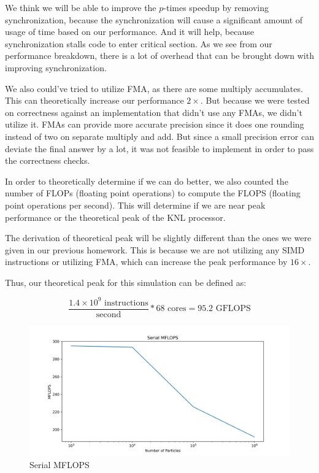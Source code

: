 \documentclass{article}
\begin{document}
We think we will be able to improve the $p$-times speedup by removing synchronization, because the synchronization will cause a significant amount of usage of time based on our performance. And it will help, because synchronization stalls code to enter critical section. As we see from our performance breakdown, there is a lot of overhead that can be brought down with improving synchronization.

We also could've tried to utilize FMA, as there are some multiply accumulates. This can theoretically increase our performance $2\times$. But because we were tested on correctness against an implementation that didn't use any FMAs, we didn't utilize it. FMAs can provide more accurate precision since it does one rounding instead of two on separate multiply and add. But since a small precision error can deviate the final answer by a lot, it was not feasible to implement in order to pass the correctness checks.

In order to theoretically determine if we can do better, we also counted the number of FLOPs (floating point operations) to compute the FLOPS (floating point operations per second). This will determine if we are near peak performance or the theoretical peak of the KNL processor.

The derivation of theoretical peak will be slightly different than the ones we were given in our previous homework. This is because we are not utilizing any SIMD instructions or utilizing FMA, which can increase the peak performance by $16\times$.

Thus, our theoretical peak for this simulation can be defined as:

$$\frac{1.4 \times 10^9 \textrm{ instructions}}{\textrm{second}} * 68 \textrm{ cores} = 95.2 \textrm{ GFLOPS}$$

\begin{figure}[H]
	\centering
	\includegraphics[width=6in]{figures/serial_flops.png}
	\caption{Serial MFLOPS}
	\label{fig:serial-flops}
\end{figure}
\end{document}
